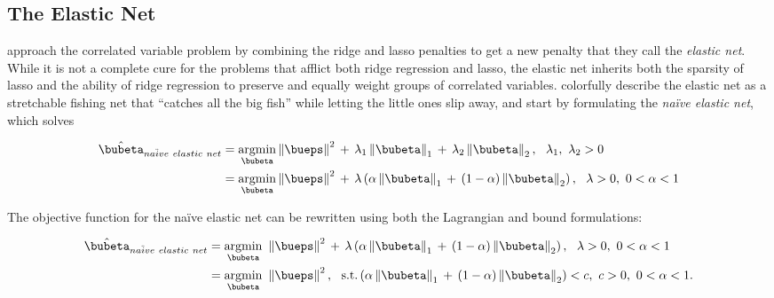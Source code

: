 \documentclass[graybox,envcountchap,sectrefs]{svmono}\usepackage[]{graphicx}\usepackage[]{xcolor}
\begin{document}
\begin{appendices}
\subsection{The Elastic Net }

\citet{ZouHastie2005} approach the correlated variable problem by
combining the ridge and lasso penalties to get a new penalty that
they call the \emph{elastic net}. While it is not a complete cure
for the problems that afflict both ridge regression and  lasso, the
elastic net inherits both the sparsity of lasso and the ability of
ridge regression to preserve and equally weight groups of correlated
variables. \citet{ZouHastie2005} colorfully describe the elastic
net as a stretchable fishing net that ``catches all the big fish''
while letting the little ones slip away, and start by formulating
the \emph{na\"{i}ve elastic net}, which solves

\begin{align}
\hat{\bubeta}_{na\ddot{i}ve\ elastic\ net} & =\underset{\bubeta}{\mathrm{argmin}}\left\Vert \bueps\right\Vert ^{2}\,+\,\lambda_{1}\left\Vert \bubeta\right\Vert _{1}\,+\,\lambda_{2}\left\Vert \bubeta\right\Vert _{2},\ \ \lambda_{1},\ \lambda_{2}>0\nonumber \\
 & =\underset{\bubeta}{\mathrm{argmin}}\left\Vert \bueps\right\Vert ^{2}\,+\,\lambda\left(\alpha\left\Vert \bubeta\right\Vert _{1}\,+\,\left(1-\alpha\right)\left\Vert \bubeta\right\Vert _{2}\right),\ \ \lambda>0,\ 0<\alpha<1\label{eq:ElasticNet}
\end{align}

The objective function for the na\"{i}ve\emph{ }elastic net can be
rewritten using both the Lagrangian and bound formulations:

\begin{subequations}
\begin{align}
\hat{\bubeta}_{na\ddot{i}ve\ elastic\ net} & =\underset{\bubeta}{\mathrm{argmin}}\ \left\Vert \bueps\right\Vert ^{2}\,+\,\lambda\left(\alpha\left\Vert \bubeta\right\Vert _{1}\,+\,\left(1-\alpha\right)\left\Vert \bubeta\right\Vert _{2}\right),\ \ \lambda>0,\ 0<\alpha<1\label{eq:ElasticNetA}\\
 & =\underset{\bubeta}{\mathrm{argmin}}\ \left\Vert \bueps\right\Vert ^{2},\ \ \mathrm{s.t.}\left(\alpha\left\Vert \bubeta\right\Vert _{1}\,+\,\left(1-\alpha\right)\left\Vert \bubeta\right\Vert _{2}\right)<c,\ c>0,\ 0<\alpha<1.\label{eq:ElasticNetB}
\end{align}
\end{subequations}


\end{appendices}
\end{document}
